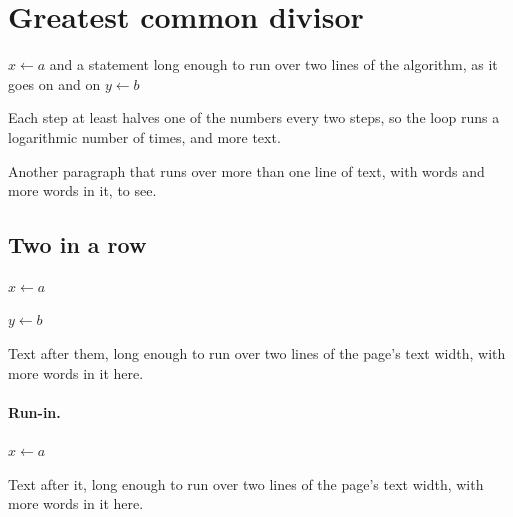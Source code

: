 \documentclass{article}
\begin{document}
\section{Greatest common divisor}
\begin{algorithm}[H]
\caption{Euclid's algorithm, with a caption long enough to run over two lines of the text width}
\begin{algorithmic}[1]
\State $x \gets a$ and a statement long enough to run over two lines of the algorithm, as it goes on and on
\State $y \gets b$
\end{algorithmic}
\end{algorithm}
Each step at least halves one of the numbers every two steps, so the loop runs a logarithmic number of times, and more text.

Another paragraph that runs over more than one line of text, with words and more words in it, to see.
\subsection{Two in a row}
\begin{algorithm}[H]
\begin{algorithmic}
\State $x \gets a$
\end{algorithmic}
\end{algorithm}
\begin{algorithm}[H]
\begin{algorithmic}
\State $y \gets b$
\end{algorithmic}
\end{algorithm}
Text after them, long enough to run over two lines of the page's text width, with more words in it here.

\paragraph{Run-in.}
\begin{algorithm}[H]
\begin{algorithmic}
\State $x \gets a$
\end{algorithmic}
\end{algorithm}
Text after it, long enough to run over two lines of the page's text width, with more words in it here.
\end{document}

